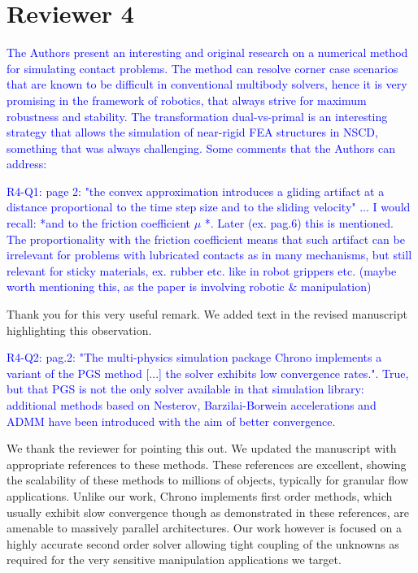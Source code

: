 \section{Reviewer 4}
\label{sec:reviewer_4}

\textcolor{blue}{
The Authors present an interesting and original research on a numerical
method for simulating contact problems. The method can resolve corner
case scenarios that are known to be difficult in conventional multibody
solvers, hence it is very promising in the framework of robotics, that
always strive for maximum robustness and stability. The transformation
dual-vs-primal is an interesting strategy that allows the simulation of
near-rigid FEA structures in NSCD, something that was always
challenging.
Some comments that the Authors can address:
}
\vspace{5mm}

\textcolor{blue}{R4-Q1: page 2: "the convex approximation introduces a gliding
artifact at a distance proportional to the time step size and to the sliding
velocity" ... I would recall: *and to the friction coefficient $\mu$ *. Later
(ex. pag.6) this is mentioned. The proportionality with the friction coefficient
means that such artifact can be irrelevant for problems with lubricated contacts
as in many mechanisms, but still relevant for sticky materials, ex. rubber etc.
like in robot grippers etc. (maybe worth mentioning this, as the paper is
involving robotic \& manipulation)}

Thank you for this very useful remark. We added text in the revised manuscript
highlighting this observation.

\vspace{5mm}

\textcolor{blue}{R4-Q2: pag.2: "The multi-physics simulation package Chrono implements a
variant of the PGS method [...] the solver exhibits low convergence
rates.". True, but that PGS is not the only solver available in that
simulation library: additional methods based on Nesterov,
Barzilai-Borwein accelerations and ADMM have been introduced with the
aim of better convergence.}

We thank the reviewer for pointing this out. We updated the manuscript with
appropriate references to these methods. These references are excellent, showing
the scalability of these methods to millions of objects, typically for granular
flow applications. Unlike our work, Chrono implements first order methods, which
usually exhibit slow convergence though as demonstrated in these references, are
amenable to massively parallel architectures. Our work however is focused on a
highly accurate second order solver allowing tight coupling of the unknowns as
required for the very sensitive manipulation applications we target.


